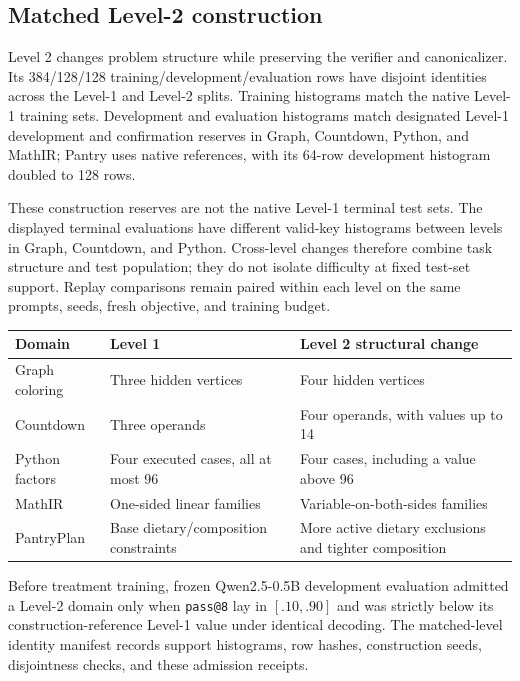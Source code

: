 \documentclass{article}
\newcommand{\1}{\mathbf 1}
\theoremstyle{remark}
\theoremstyle{definition}
\theoremstyle{plain}
\begin{document}
\subsection{Matched Level-2 construction}
\label{app:data-levels}

Level 2 changes problem structure while preserving the verifier and
canonicalizer. Its 384/128/128 training/development/evaluation rows have
disjoint identities across the Level-1 and Level-2 splits. Training histograms
match the native Level-1 training sets. Development and evaluation histograms
match designated Level-1 development and confirmation reserves in Graph,
Countdown, Python, and MathIR; Pantry uses native references, with its
64-row development histogram doubled to 128 rows.

These construction reserves are not the native Level-1 terminal test sets.
The displayed terminal evaluations have different valid-key histograms
between levels in Graph, Countdown, and Python. Cross-level changes therefore
combine task structure and test population; they do not isolate difficulty
at fixed test-set support. Replay comparisons remain paired within each
level on the same prompts, seeds, fresh objective, and training budget.

\begin{center}
\small
\begin{tabularx}{.96\linewidth}{@{}lYY@{}}
\toprule
\textbf{Domain} & \textbf{Level 1} & \textbf{Level 2 structural change} \\
\midrule
Graph coloring & Three hidden vertices & Four hidden vertices \\
Countdown & Three operands & Four operands, with values up to 14 \\
Python factors & Four executed cases, all at most 96 & Four cases, including a value above 96 \\
MathIR & One-sided linear families & Variable-on-both-sides families \\
PantryPlan & Base dietary/composition constraints & More active dietary exclusions and tighter composition \\
\bottomrule
\end{tabularx}
\end{center}

Before treatment training, frozen Qwen2.5-0.5B development evaluation admitted
a Level-2 domain only when \texttt{pass@8} lay in $[.10,.90]$ and was strictly below
its construction-reference Level-1 value under identical decoding. The matched-level
identity manifest records support histograms, row hashes, construction
seeds, disjointness checks, and these admission receipts.
\end{document}
